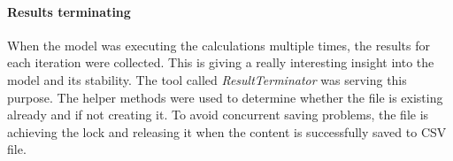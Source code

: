 \paragraph{Results terminating}\label{para:results-terminating}
When the model was executing the calculations multiple times, the results for each iteration were collected.
This is giving a really interesting insight into the model and its stability.
The tool called \mbox{\textit{ResultTerminator}} was serving this purpose.
The helper methods were used to determine whether the file is existing already and if not creating it.
To avoid concurrent saving problems, the file is achieving the lock and releasing it when the content is successfully saved to CSV file.
